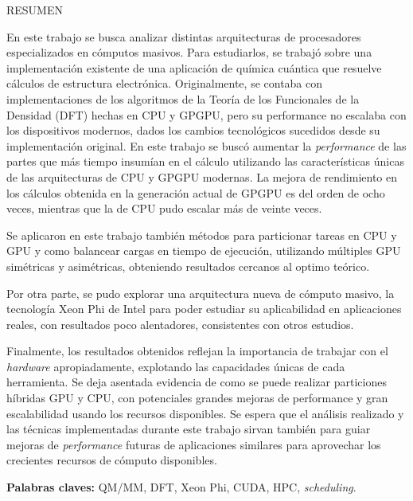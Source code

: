 \begin{center}
\large \textsc{RESUMEN}
\end{center}
\vspace{1cm}

\noindent

En este trabajo se busca analizar distintas arquitecturas de procesadores especializados
en c\'omputos masivos. Para estudiarlos, se trabaj\'o sobre una implementaci\'on existente
de una aplicaci\'on de qu\'imica cu\'antica que resuelve c\'alculos de estructura electr\'onica.
Originalmente, se contaba con implementaciones de los algoritmos de la Teor\'ia de los
Funcionales de la Densidad (DFT) hechas en CPU y GPGPU, pero su performance no escalaba con los
dispositivos modernos, dados los cambios tecnol\'ogicos sucedidos desde su implementaci\'on original.
En este trabajo se busc\'o
aumentar la \textit{performance} de las partes que m\'as tiempo insum\'ian en el c\'alculo utilizando
las caracter\'isticas \'unicas de las arquitecturas de CPU y GPGPU modernas. La mejora de
rendimiento en los c\'alculos obtenida en la generaci\'on actual de GPGPU es del orden de ocho
veces, mientras que la de CPU pudo escalar m\'as de veinte veces.

Se aplicaron en este trabajo tambi\'en m\'etodos para particionar tareas en CPU y GPU y como
balancear cargas en tiempo de ejecuci\'on, utilizando m\'ultiples GPU sim\'etricas y asim\'etricas,
obteniendo resultados cercanos al optimo te\'orico.

Por otra parte, se pudo explorar una arquitectura nueva de c\'omputo masivo, la
tecnolog\'ia Xeon Phi de Intel para poder estudiar su aplicabilidad en aplicaciones reales, con
resultados poco alentadores, consistentes con otros estudios.

Finalmente, los resultados obtenidos reflejan la importancia de trabajar con el \textit{hardware}
apropiadamente, explotando las capacidades \'unicas de cada herramienta. Se deja asentada evidencia
de como se puede realizar particiones h\'ibridas GPU y CPU, con potenciales grandes mejoras
de performance y gran escalabilidad usando los recursos disponibles. Se espera que el an\'alisis
realizado y las t\'ecnicas implementadas durante este trabajo sirvan tambi\'en para guiar mejoras
de \textit{performance} futuras de aplicaciones similares para aprovechar los crecientes recursos de c\'omputo
disponibles.

\bigskip

\noindent\textbf{Palabras claves:} QM/MM, DFT, Xeon Phi, CUDA, HPC, \textit{scheduling}.
